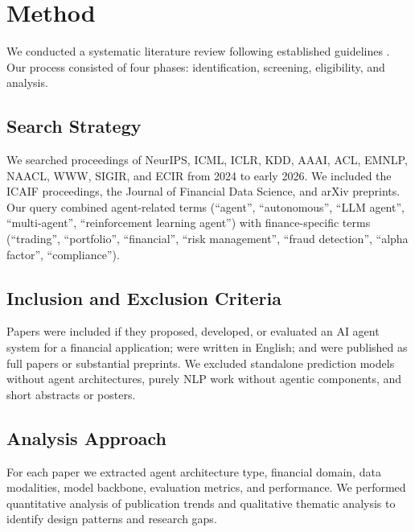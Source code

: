 \documentclass[12pt]{report}
\begin{document}
\chapter{Method}

We conducted a systematic literature review following established guidelines \citep{kitchenham2004procedures}. Our process consisted of four phases: identification, screening, eligibility, and analysis.

\section{Search Strategy}

We searched proceedings of NeurIPS, ICML, ICLR, KDD, AAAI, ACL, EMNLP, NAACL, WWW, SIGIR, and ECIR from 2024 to early 2026. We included the ICAIF proceedings, the Journal of Financial Data Science, and arXiv preprints. Our query combined agent-related terms (``agent'', ``autonomous'', ``LLM agent'', ``multi-agent'', ``reinforcement learning agent'') with finance-specific terms (``trading'', ``portfolio'', ``financial'', ``risk management'', ``fraud detection'', ``alpha factor'', ``compliance'').

\section{Inclusion and Exclusion Criteria}

Papers were included if they proposed, developed, or evaluated an AI agent system for a financial application; were written in English; and were published as full papers or substantial preprints. We excluded standalone prediction models without agent architectures, purely NLP work without agentic components, and short abstracts or posters.

\section{Analysis Approach}

For each paper we extracted agent architecture type, financial domain, data modalities, model backbone, evaluation metrics, and performance. We performed quantitative analysis of publication trends and qualitative thematic analysis to identify design patterns and research gaps.


\end{document}
